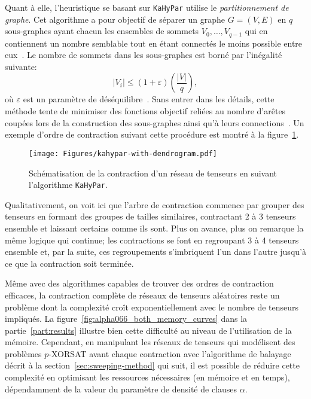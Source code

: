 Quant à elle, l'heuristique se basant sur \verb|KaHyPar| utilise le \textit{partitionnement de graphe}.
Cet algorithme a pour objectif de séparer un graphe $G = (V, E)$ en $q$ sous-graphes ayant chacun les ensembles de sommets $V_0, \dots, V_{q-1}$ qui en contiennent un nombre semblable tout en étant connectés le moins possible entre eux~\cite{paper-kahypar}.
Le nombre de sommets dans les sous-graphes est borné par l'inégalité suivante:
\begin{equation}
    |V_i| \leq (1 + \varepsilon)\left(\frac{|V|}{q}\right),
\end{equation}
où $\varepsilon$ est un paramètre de déséquilibre~\cite{paper-kahypar}.
Sans entrer dans les détails, cette méthode tente de minimiser des fonctions objectif reliées au nombre d'arêtes coupées lors de la construction des sous-graphes ainsi qu'à leurs connections~\cite{PhDThesis-kahypar}.
Un exemple d'ordre de contraction suivant cette procédure est montré à la figure~\ref{fig:kahypar-with-dendrogram}.
\begin{figure}[h!]
    \centering
    \texttt{[image: Figures/kahypar-with-dendrogram.pdf]}
    \caption[Schématisation de la contraction d'un réseau de tenseurs (\texttt{KaHyPar}).]{Schématisation de la contraction d'un réseau de tenseurs en suivant l'algorithme \texttt{KaHyPar}.}
    \label{fig:kahypar-with-dendrogram}
\end{figure}
Qualitativement, on voit ici que l'arbre de contraction commence par grouper des tenseurs en formant des groupes de tailles similaires, contractant 2 à 3 tenseurs ensemble et laissant certains comme ils sont.
Plus on avance, plus on remarque la même logique qui continue; les contractions se font en regroupant 3 à 4 tenseurs ensemble et, par la suite, ces regroupements s'imbriquent l'un dans l'autre jusqu'à ce que la contraction soit terminée.

Même avec des algorithmes capables de trouver des ordres de contraction efficaces, la contraction complète de réseaux de tenseurs aléatoires reste un problème dont la complexité croît exponentiellement avec le nombre de tenseurs impliqués.
La figure~\ref{fig:alpha066_both_memory_curves} dans la partie~\ref{part:results} illustre bien cette difficulté au niveau de l'utilisation de la mémoire.
Cependant, en manipulant les réseaux de tenseurs qui modélisent des problèmes $p$-XORSAT avant chaque contraction avec l'algorithme de balayage décrit à la section~\ref{sec:sweeping-method} qui suit, il est possible de réduire cette complexité en optimisant les ressources nécessaires (en mémoire et en temps), dépendamment de la valeur du paramètre de densité de clauses $\alpha$.


